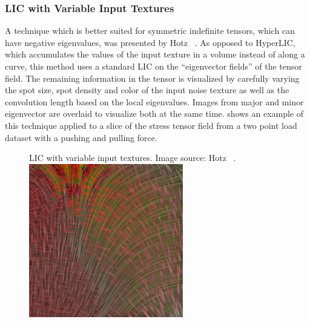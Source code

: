 \subsubsection{\ac{LIC} with Variable Input Textures} %
\label{ssub:lic_with_variable_input_textures}
%
A technique which is better suited for symmetric indefinite tensors, which can
have negative eigenvalues, was presented by Hotz \etal~\cite{Hotz2004}.
%
As opposed to HyperLIC, which accumulates the values of the input texture in a
volume instead of along a curve, this method uses a standard \ac{LIC} on the
``eigenvector fields'' of the tensor field.
%
The remaining information in the tensor is visualized by carefully varying the
spot size, spot density and color of the input noise texture as well as the
convolution length based on the local eigenvalues.
%
Images from major and minor eigenvector are overlaid to visualize both at the
same time.
%
 shows an example of this technique applied to a slice
of the stress tensor field from a two point load dataset with a pushing and
pulling force.
%
\begin{figure}[t]
    \begin{captionbeside}{LIC with variable input textures. Image source: Hotz
    \etal~\cite{Hotz2004}.\label{fig:lic_var_tex}}
        \includegraphics[width=0.6\textwidth]{figures/tensor_lic_variable_texture.png}
    \end{captionbeside}
\end{figure}
%

